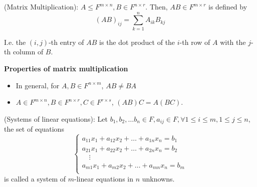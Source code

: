 \begin{definition}
(Matrix Multiplication): $A \leq F^{m \times n}, B \in F^{n \times r}$. Then, $AB \in F^{m \times r}$ is defined by 
    \[
        (AB)_{ij} = \sum\limits_{k = 1}^{n}  A_{ik}B_{k j}
    \]

    I.e. the $(i, j)$-th entry of $AB$ is the dot product of the $i$-th row of $A$ with the $j$-th column of $B$.
\end{definition} 

\begin{remark}
\textbf{Properties of matrix multiplication}
\begin{itemize}
    \item In general, for $A, B \in F^{n \times m}$, $AB \neq BA$ 
    \item $A \in F^{m \times n}, B \in F^{n \times r}, C \in F^{r \times s}$, $(AB)C = A(BC)$. 
\end{itemize} 

\end{remark}


\begin{definition}
(Systems of linear equations): Let $b_1, b_2, \hdots b_n \in F, a_{ij} \in F, \forall 1 \leq i \leq m, 1 \leq j \leq n$, the set of equations 
    \[
        \begin{cases}
            a_{11}x_1 + a_{12}x_2 + \hdots + a_{1n}x_n = b_1 \\
            a_{21}x_1 + a_{22}x_2 + \hdots + a_{2n}x_n = b_2 \\
            \quad \vdots  \\
            a_{m1}x_1 + a_{m2}x_2 + \hdots + a_{mn}x_n = b_m \\
        \end{cases}
    \]
    is called a system of $m$-linear equations in $n$ unknowns.
\end{definition} 

